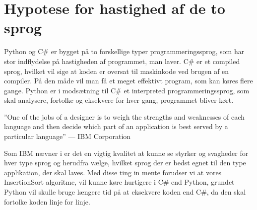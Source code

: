 \documentclass[class=report, crop=false]{standalone}
\begin{document}
    \section{Hypotese for hastighed af de to sprog}
        Python og C\# er bygget på to forskellige typer programmeringssprog, som har stor indflydelse på hastigheden af programmet, man laver. C\# er et compiled sprog, hvilket vil sige at koden er oversat til maskinkode ved brugen af en compiler. På den måde vil man få et meget effektivt program, som kan køres flere gange. Python er i modsætning til C\# et interpreted programmeringssprog, som skal analysere, fortolke og eksekvere for hver gang, programmet bliver kørt.
        \begin{displayquote}
        ”One of the jobs of a designer is to weigh the strengths and weaknesses of each language and then decide which part of an application is best served by a particular language” --- IBM Corporation\cite{ibmcomvsint}
        \end{displayquote}
        Som IBM nævner i \cite{ibmcomvsint} er det en vigtig kvalitet at kunne se styrker og svagheder for hver type sprog og herudfra vælge, hvilket sprog der er bedst egnet til den type applikation, der skal laves. Med disse ting in mente forudser vi at vores InsertionSort algoritme, vil kunne køre hurtigere i C\# end Python, grundet Python vil skulle bruge længere tid på at eksekvere koden end C\#, da den skal fortolke koden linje for linje.
\end{document}
